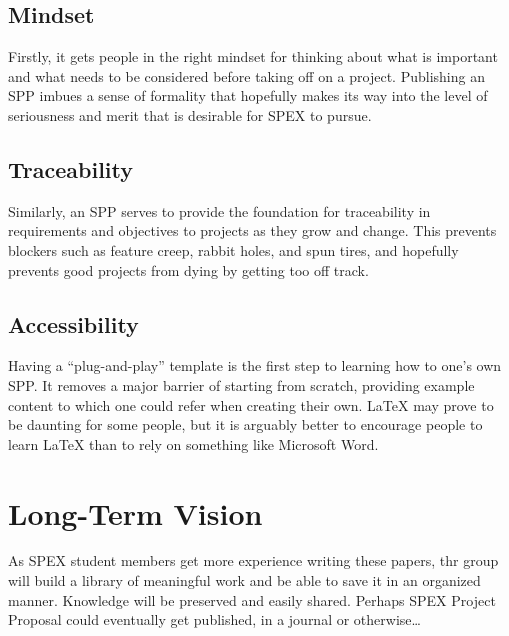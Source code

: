 \documentclass[journal]{SPEXformat}
\begin{document}
\subsection{Mindset}
\label{subsec:mindset}
Firstly, it gets people in the right mindset for thinking about what is important and what needs to be considered before taking off on a project.
Publishing an SPP imbues a sense of formality that hopefully makes its way into the level of seriousness and merit that is desirable for SPEX to pursue.

\subsection{Traceability}
\label{subsec:traceability}
Similarly, an SPP serves to provide the foundation for traceability in requirements and objectives to projects as they grow and change.
This prevents blockers such as feature creep, rabbit holes, and spun tires, and hopefully prevents good projects from dying by getting too off track.

\subsection{Accessibility}
\label{subsec:plug-n-play}
Having a ``plug-and-play'' template is the first step to learning how to one's own SPP\@.
It removes a major barrier of starting from scratch, providing example content to which one could refer when creating their own.
\LaTeX{} may prove to be daunting for some people, but it is arguably better to encourage people to learn LaTeX than to rely on something like Microsoft Word.

\section{Long-Term Vision}
\label{sec:vision}
As SPEX student members get more experience writing these papers, thr group will build a library of meaningful work and be able to save it in an organized manner.
Knowledge will be preserved and easily shared.
Perhaps SPEX Project Proposal could eventually get published, in a journal or otherwise\ldots
\end{document}

